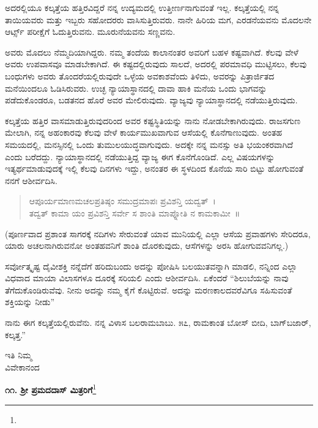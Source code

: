 ಅದರಲ್ಲಿಯೂ ಕಲ್ಕತ್ತೆಯ ಹತ್ತಿರವಿದ್ದರೆ ನನ್ನ ಉದ್ಯಮದಲ್ಲಿ ಉತ್ತೀರ್ಣನಾಗುವಂತೆ ಇಲ್ಲ. ಕಲ್ಕತ್ತೆಯಲ್ಲಿ ನನ್ನ ತಾಯಿಯವರು ಮತ್ತು ಇಬ್ಬರು ಸಹೋದರರು ವಾಸಿಸು\break ತ್ತಿರುವರು. ನಾನೇ ಹಿರಿಯ ಮಗ, ಎರಡನೆಯವನು ಮೊದಲನೇ ಆರ್ಟ್ಸ್ ಪರೀಕ್ಷೆಗೆ ಓದು\break ತ್ತಿರುವನು. ಮೂರುನೆಯವನು ಸಣ್ಣವನು.

ಅವರು ಮೊದಲು ನೆಮ್ಮದಿಯಾಗಿದ್ದರು. ನಮ್ಮ ತಂದೆಯ ಕಾಲಾನಂತರ ಅವರಿಗೆ ಬಹಳ ಕಷ್ಟವಾಗಿದೆ. ಕೆಲವು ವೇಳೆ ಅವರು ಉಪವಾಸವೂ ಮಾಡಬೇಕಾಗಿದೆ. ಈ ಕಷ್ಟದಲ್ಲಿರುವುದು ಸಾಲದೆ, ಅದರಲ್ಲಿ ಪರಮಾವಧಿ ಮುಟ್ಟಿಸಲು, ಕೆಲವು ಬಂಧುಗಳು ಅವರು ತೊಂದರೆಯಲ್ಲಿರುವುದೇ ಒಳ್ಳೆಯ ಅವಕಾಶವೆಂದು ತಿಳಿದು, ಅವರನ್ನು ಪಿತ್ರಾರ್ಜಿತದ ಮನೆಯಿಂದಲೂ ಓಡಿಸಿರುವರು. ಉಚ್ಛ ನ್ಯಾಯಾಸ್ಥಾನದಲ್ಲಿ ದಾವಾ ಹಾಕಿ ಮನೆಯ ಒಂದು ಭಾಗವನ್ನು ಪಡೆದುಕೊಂಡರೂ, ಬಡತನದ ಹೊರೆ ಅವರ ಮೇಲಿರುವುದು. ವ್ಯಾಜ್ಯವು ನ್ಯಾಯಾಸ್ಥಾನದಲ್ಲಿ ನಡೆಯುತ್ತಿರುವುದು.

ಕಲ್ಕತ್ತೆಯ ಹತ್ತಿರ ವಾಸಮಾಡುತ್ತಿರುವುದರಿಂದ ಅವರ ಕಷ್ಟಸ್ಥಿತಿಯನ್ನು ನಾನು ನೋಡಬೇಕಾಗಿರುವುದು. ರಾಜಸಗುಣ ಮೇಲಾಗಿ, ನನ್ನ ಅಹಂಕಾರವು ಕೆಲವು ವೇಳೆ ಕಾರ್ಯಮುಖವಾಗುವ ಆಸೆಯಲ್ಲಿ ಕೊನೆಗಾಣುವುದು. ಅಂತಹ ಸಮಯದಲ್ಲಿ, ಮನಸ್ಸಿನಲ್ಲಿ ಒಂದು ತುಮುಲಯುದ್ಧವಾಗುವುದು. ಅದಕ್ಕೇ ನನ್ನ ಮನಸ್ಸು ಅತಿ ಭಯಂಕರವಾಗಿದೆ ಎಂದು ಬರೆದದ್ದು. ನ್ಯಾಯಾಸ್ಥಾನದಲ್ಲಿ ನಡೆಯುತ್ತಿದ್ದ ವ್ಯಾಜ್ಯ ಈಗ ಕೊನೆಗೊಂಡಿದೆ. ಎಲ್ಲ ವಿಷಯಗಳನ್ನು ಇತ್ಯರ್ಥಮಾಡುವುದಕ್ಕೆ ಇಲ್ಲಿ ಕೆಲವು ದಿನಗಳು ಇದ್ದು, ಅನಂತರ ಈ ಸ್ಥಳದಿಂದ ಕೊನೆಯ ಸಾರಿ ಬಿಟ್ಟು ಹೋಗುವಂತೆ ನನಗೆ ಆಶೀರ್ವದಿಸಿ.

\begin{verse}
 ಆಪೂರ್ಯಮಾಣಮಚಲಪ್ರತಿಷ್ಠಂ ಸಮುದ್ರಮಾಪಃ ಪ್ರವಿಶನ್ತಿ ಯದ್ವತ್~।\\
 ತದ್ವತ್ ಕಾಮಾ ಯಂ ಪ್ರವಿಶನ್ತಿ ಸರ್ವೇ ಸ ಶಾಂತಿ ಮಾಪ್ನೋತಿ ನ ಕಾಮಕಾಮೀ~॥ 
\end{verse}


(ಪೂರ್ಣವಾದ ಪ್ರಶಾಂತ ಸಾಗರಕ್ಕೆ ನದಿಗಳು ಸೇರುವಂತೆ ಯಾವ ಮುನಿಯಲ್ಲಿ ಎಲ್ಲಾ ಆಸೆಯ ಪ್ರವಾಹಗಳು ಸೇರಿದರೂ, ಯಾರು ಅಚಲನಾಗಿರುವನೋ ಅಂತಹವನಿಗೆ ಶಾಂತಿ ದೊರಕುವುದು, ಆಸೆಗಳನ್ನು ಅರಸಿ ಹೋಗುವವನಿಗಲ್ಲ.)

ಸರ್ವೋತ್ಕೃಷ್ಟ ದೈವೀಶಕ್ತಿ ನನ್ನೆದೆಗೆ ಹರಿದುಬಂದು ಅದನ್ನು ಪೋಷಿಸಿ ಬಲಯುತವನ್ನಾಗಿ ಮಾಡಲಿ, ನನ್ನಿಂದ ಎಲ್ಲಾ ವಿಧವಾದ ಮಾಯಾ ವಿಲಾಸಗಳೂ ದೂರಕ್ಕೆ ಸರಿಯಲಿ ಎಂದು ಆಶೀರ್ವದಿಸಿ. ಏಕೆಂದರೆ “ಶಿಲುಬೆಯನ್ನು ನಾವು ತೆಗೆದುಕೊಂಡಿರುವೆವು. ನೀನು ಅದನ್ನು ನಮ್ಮ ಕೈಗೆ ಕೊಟ್ಟಿರುವೆ. ಅದನ್ನು ಮರಣಕಾಲದವರೆವಿಗೂ ಸಹಿಸುವಂತೆ ಶಕ್ತಿಯನ್ನು ನೀಡು” 

ನಾನು ಈಗ ಕಲ್ಕತ್ತೆಯಲ್ಲಿರುವೆನು. ನನ್ನ ವಿಳಾಸ  ಬಲರಾಮಬಾಬು. ೫೭, ರಾಮಕಾಂತ ಬೋಸ್ ಬೀದಿ, ಬಾಗ್‌ಬಜಾರ್, ಕಲ್ಕತ್ತ.”

{\flushright
ಇತಿ ನಿಮ್ಮ\\ವಿವೇಕಾನಂದ\par}

\begin{center}
\textbf{೧೧. ಶ‍್ರೀ ಪ್ರಮದದಾಸ್ ಮಿತ್ರರಿಗೆ}\footnote{}
\end{center}

